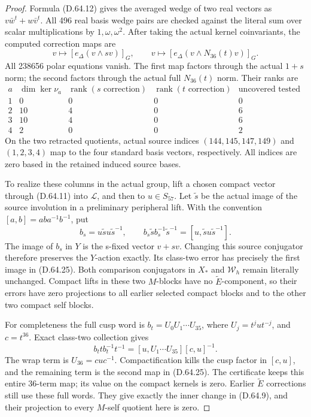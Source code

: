 \begin{proof}
Formula (D.64.12) gives the averaged wedge of
two real vectors as
\(v\bar w^t+w\bar v^t\). All 496 real basis
wedge pairs are checked against the literal
sum over scalar multiplications by
\(1,\omega,\omega^2\).
After taking the actual kernel coinvariants,
the computed correction maps are
\[
 v\longmapsto[e_\Delta(v\wedge sv)]_G,
 \qquad
 v\longmapsto[e_\Delta(v\wedge N_{36}(t)v)]_G.
 \tag{D.64.25}
\]
All 238656 polar equations vanish. The first
map factors through the actual \(1+s\) norm;
the second factors through the actual full
\(N_{36}(t)\) norm. Their ranks are
\[
 \begin{array}{c|r|r|r|r}
 a&\dim\ker\nu_a&\operatorname{rank}(s\text{ correction})
       &\operatorname{rank}(t\text{ correction})
       &\text{uncovered tested coordinates}\\\hline
 1&0&0&0&0\\
 2&10&4&0&6\\
 3&10&4&0&6\\
 4&2&0&0&2
 \end{array}
 \tag{D.64.26}
\]
On the two retracted quotients, actual source
indices \((144,145,147,149)\) and
\((1,2,3,4)\) map to the four standard basis
vectors, respectively. All indices are zero
based in the retained induced source bases.

To realize these columns in the actual group,
lift a chosen compact vector through
(D.64.11) into \(\mathcal L\), and then to
\(u\in S_{57}\). Let \(\widetilde s\) be the
actual image of the source involution in a
preliminary peripheral lift. With the convention
\([a,b]=aba^{-1}b^{-1}\), put
\[
 b_s=u\widetilde s u\widetilde s^{-1},\qquad
 b_s\widetilde s b_s^{-1}\widetilde s^{-1}
                 =[u,\widetilde s u\widetilde s^{-1}].
 \tag{D.64.27}
\]
The image of \(b_s\) in \(Y\) is the s-fixed
vector \(v+sv\). Changing this source conjugator
therefore preserves the \(Y\)-action exactly.
Its class-two error has precisely the first
image in (D.64.25). Both comparison conjugators
in \(X_*\) and \(\mathcal W_h\) remain literally
unchanged. Compact lifts in these two \(M\)-blocks
have no \(\widetilde E\)-component, so their
errors have zero projections to all earlier
selected compact blocks and to the other two
compact self blocks.

For completeness the full cusp word is
\(b_t=U_0U_1\cdots U_{35}\), where
\(U_j=t^jut^{-j}\), and \(c=t^{36}\).
Exact class-two collection gives
\[
 b_ttb_t^{-1}t^{-1}
      =[u,U_1\cdots U_{35}][c,u]^{-1}.
 \tag{D.64.28}
\]
The wrap term is \(U_{36}=cuc^{-1}\).
Compactification kills the cusp factor in
\([c,u]\), and the remaining term is the
second map in (D.64.25). The certificate keeps
this entire 36-term map; its value on the
compact kernels is zero. Earlier \(\widetilde E\)
corrections still use these full words. They
give exactly the inner change in (D.64.9),
and their projection to every \(M\)-self
quotient here is zero.


\end{proof}
